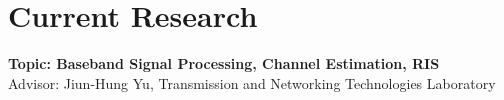 \section*{Current Research} 
  \resumeSubHeadingListStart
    {\item{
        \textbf{\normalsize Topic: Baseband Signal Processing, Channel Estimation, RIS} \\[3pt]
        {Advisor: Jiun-Hung Yu, Transmission and Networking Technologies Laboratory}
    }}
  \resumeSubHeadingListEnd